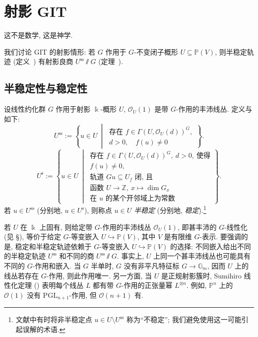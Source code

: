 \section{射影 GIT}\label{src:8.2}
\begin{epigraph}
这不是数学, 这是神学.
\end{epigraph}
我们讨论 GIT 的射影情形: 若 $G$ 作用于 $G$-不变闭子概形 $U\subseteq\mathbb P(V)$, 则半稳定轨迹 (定义~) 有射影良商 $U^{\mathrm{ss}}\sslash G$ (定理~).
\subsection{半稳定性与稳定性}\label{src:8.2.1-subsection}
\begin{definition}\label{src:8.2.1}
设线性约化群 $G$ 作用于射影 $\Bbbk$-概形 $U$, $\mathcal O_U(1)$ 是带 $G$-作用的丰沛线丛. 定义与如下:\footnotemark
\[
U^{\mathrm{ss}}:=\left\{u\in U\ \middle|\ \begin{array}{l}\text{存在 }f\in\Gamma(U,\mathcal O_U(d))^G,\\d>0,\quad f(u)\ne0\end{array}\right\}.
\]
\[
U^{\mathrm s}:=\left\{u\in U\ \middle|\ \begin{array}{l}\text{存在 }f\in\Gamma(U,\mathcal O_U(d))^G,\ d>0,\ \text{使得}\\f(u)\ne0,\\\text{轨道 }Gu\subseteq U_f\text{ 闭, 且}\\\text{函数 }U\to\mathbb Z,\ x\mapsto\operatorname{dim} G_x\\\text{在 }u\text{ 的某个开邻域上为常数}\end{array}\right\}.
\]
若 $u\in U^{\mathrm{ss}}$ (分别地, $u\in U^{\mathrm s}$), 则称点 $u\in U$ \textit{半稳定} (分别地, \textit{稳定}).\footnote{文献中有时将非半稳定点 $u\in U\setminus U^{\mathrm{ss}}$ 称为``不稳定''; 我们避免使用这一可能引起误解的术语.}
\end{definition}
\begin{remark}\label{src:8.2.2}
若 $U$ 在 $\Bbbk$ 上固有, 则给定带 $G$-作用的丰沛线丛 $\mathcal O_U(1)$, 即甚丰沛的 $G$-线性化 (见 \S{}), 等价于给定 $G$-等变嵌入 $U\hookrightarrow\mathbb P(V)$, 其中 $V$ 是有限维 $G$-表示. 要强调的是, 稳定和半稳定轨迹依赖于 $G$-等变嵌入 $U\hookrightarrow\mathbb P(V)$ 的选择: 不同嵌入给出不同的半稳定轨迹 $U^{\mathrm{ss}}$ 和不同的商 $U^{\mathrm{ss}}\sslash G$. 事实上, $U$ 上同一个甚丰沛线丛也可能具有不同的 $G$-作用和嵌入. 当 $G$ 半单时, $G$ 没有非平凡特征标 $G\to\mathbb G_m$, 因而 $U$ 上的线丛若存在 $G$-作用, 则此作用唯一. 另一方面, 当 $U$ 是正规射影簇时, Sumihiro 线性化定理 () 表明每个线丛 $L$ 都有带 $G$-作用的正张量幂 $L^{\otimes n}$. 例如, $\mathbb P^n$ 上的 $\mathcal O(1)$ 没有 $\mathrm{PGL}_{n+1}$-作用, 但 $\mathcal O(n+1)$ 有.
\end{remark}
